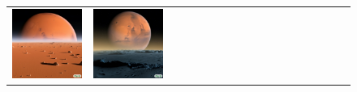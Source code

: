 \begin{figure}[ht!]
\begin{adjustwidth}{-0.8in}{-0.5in}
\begin{tabular}{cccccccccccccccccccc}
\multicolumn{2}{c}{\includegraphics[width=\threebythreecolwidth\textwidth]{figures/cherries/mars1.jpg}} &
\multicolumn{2}{c}{\includegraphics[width=\threebythreecolwidth\textwidth]{figures/cherries/mars2.jpg}} &

\end{tabular}
\end{adjustwidth}
\end{figure}
